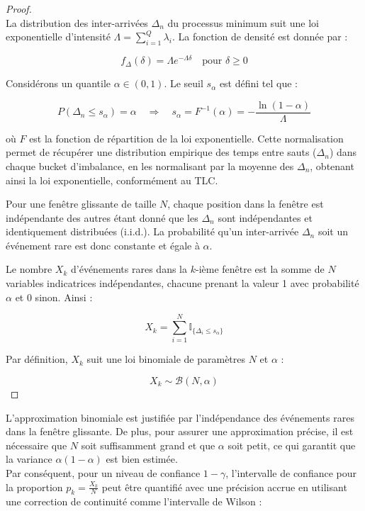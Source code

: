 \documentclass[12pt,a4paper]{article}
\theoremstyle{definition}
\theoremstyle{remark}
\begin{document}
    \begin{proof}
    \\

    La distribution des inter-arrivées $\Delta_n$ du processus minimum suit une loi exponentielle d'intensité $\Lambda = \sum_{i=1}^Q \lambda_i$. La fonction de densité est donnée par :

    \[
    f_{\Delta}(\delta) = \Lambda e^{-\Lambda \delta} \quad \text{pour } \delta \geq 0
    \]

    Considérons un quantile $\alpha \in (0,1)$. Le seuil $s_\alpha$ est défini tel que :

    \[
    P(\Delta_n \leq s_\alpha) = \alpha \quad \Rightarrow \quad s_\alpha = F^{-1}(\alpha) = -\frac{\ln(1 - \alpha)}{\Lambda}
    \]

    où $F$ est la fonction de répartition de la loi exponentielle. Cette normalisation permet de récupérer une distribution empirique des temps entre sauts ($\Delta_n$) dans chaque bucket d'imbalance, en les normalisant par la moyenne des $\Delta_n$, obtenant ainsi la loi exponentielle, conformément au TLC.



    Pour une fenêtre glissante de taille $N$, chaque position dans la fenêtre est indépendante des autres étant donné que les $\Delta_n$ sont indépendantes et identiquement distribuées (i.i.d.). La probabilité qu'un inter-arrivée $\Delta_n$ soit un événement rare est donc constante et égale à $\alpha$.

    Le nombre $X_k$ d'événements rares dans la $k$-ième fenêtre est la somme de $N$ variables indicatrices indépendantes, chacune prenant la valeur 1 avec probabilité $\alpha$ et 0 sinon. Ainsi :

    \[
    X_k = \sum_{i=1}^{N} \mathbb{I}_{\{\Delta_i \leq s_\alpha\}}
    \]

    Par définition, $X_k$ suit une loi binomiale de paramètres $N$ et $\alpha$ :

    \[
    X_k \sim \mathcal{B}(N, \alpha)
    \]
    
    \end{proof}

    \newline
    L'approximation binomiale est justifiée par l'indépendance des événements rares dans la fenêtre glissante. De plus, pour assurer une approximation précise, il est nécessaire que $N$ soit suffisamment grand et que $\alpha$ soit petit, ce qui garantit que la variance $\alpha(1 - \alpha)$ est bien estimée.
\\
    Par conséquent, pour un niveau de confiance $1 - \gamma$, l'intervalle de confiance pour la proportion $p_k = \frac{X_k}{N}$ peut être quantifié avec une précision accrue en utilisant une correction de continuité comme l'intervalle de Wilson :
\end{document}
